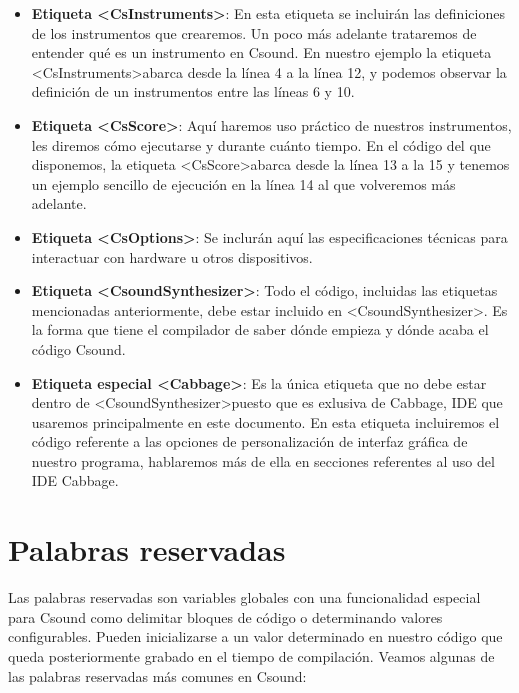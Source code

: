 \begin{itemize}
 \item \textbf{Etiqueta \textless CsInstruments\textgreater}: En esta etiqueta se incluirán las definiciones de los instrumentos que crearemos. Un poco más adelante trataremos de entender qué es un instrumento en Csound. En nuestro ejemplo la etiqueta \textless CsInstruments\textgreater abarca desde la línea 4 a la línea 12, y podemos observar la definición de un instrumentos entre las líneas 6 y 10.
 \item \textbf{Etiqueta \textless CsScore\textgreater}: Aquí haremos uso práctico de nuestros instrumentos, les diremos cómo ejecutarse y durante cuánto tiempo. En el código del que disponemos, la etiqueta \textless CsScore\textgreater abarca desde la línea 13 a la 15 y tenemos un ejemplo sencillo de ejecución en la línea 14 al que volveremos más adelante.
 \item \textbf{Etiqueta \textless CsOptions\textgreater}: Se inclurán aquí las especificaciones técnicas para interactuar con hardware u otros dispositivos.
 \item \textbf{Etiqueta \textless CsoundSynthesizer\textgreater}: Todo el código, incluidas las etiquetas mencionadas anteriormente, debe estar incluido en \textless CsoundSynthesizer\textgreater. Es la forma que tiene el compilador de saber dónde empieza y dónde acaba el código Csound.
 \item \textbf{Etiqueta especial \textless Cabbage\textgreater}: Es la única etiqueta que no debe estar dentro de \textless CsoundSynthesizer\textgreater puesto que es exlusiva de Cabbage, IDE que usaremos principalmente en este documento. En esta etiqueta incluiremos el código referente a las opciones de personalización de interfaz gráfica de nuestro programa, hablaremos más de ella en secciones referentes al uso del IDE Cabbage.
\end{itemize}

\section{Palabras reservadas}\label{sec:reservadas} 

Las palabras reservadas son variables globales con una funcionalidad especial para Csound como delimitar bloques de código o determinando valores configurables. Pueden inicializarse a un valor determinado en nuestro código que queda posteriormente grabado en el tiempo  de compilación.
Veamos algunas de las palabras reservadas más comunes en Csound:

